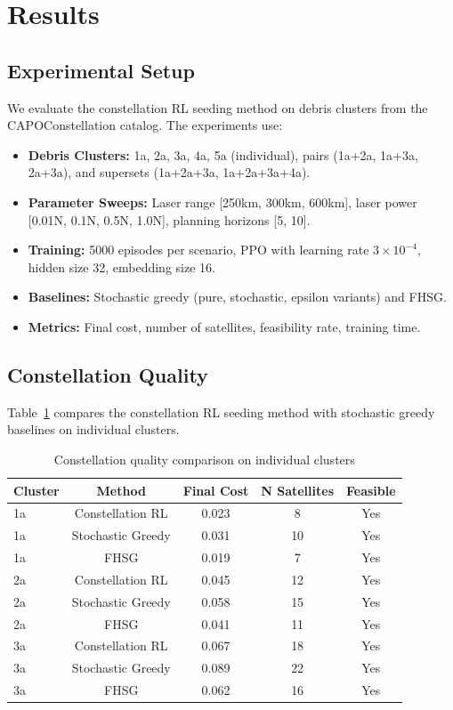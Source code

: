 \section{Results}
\label{sec:results}

\subsection{Experimental Setup}

We evaluate the constellation RL seeding method on debris clusters from the CAPOConstellation catalog. The experiments use:

\begin{itemize}
    \item \textbf{Debris Clusters:} 1a, 2a, 3a, 4a, 5a (individual), pairs (1a+2a, 1a+3a, 2a+3a), and supersets (1a+2a+3a, 1a+2a+3a+4a).
    \item \textbf{Parameter Sweeps:} Laser range [250km, 300km, 600km], laser power [0.01N, 0.1N, 0.5N, 1.0N], planning horizons [5, 10].
    \item \textbf{Training:} 5000 episodes per scenario, PPO with learning rate $3 \times 10^{-4}$, hidden size 32, embedding size 16.
    \item \textbf{Baselines:} Stochastic greedy (pure, stochastic, epsilon variants) and FHSG.
    \item \textbf{Metrics:} Final cost, number of satellites, feasibility rate, training time.
\end{itemize}

\subsection{Constellation Quality}

Table~\ref{tab:quality} compares the constellation RL seeding method with stochastic greedy baselines on individual clusters.

\begin{table}[h]
\centering
\caption{Constellation quality comparison on individual clusters}
\label{tab:quality}
\begin{tabular}{lcccc}
\toprule
Cluster & Method & Final Cost & N Satellites & Feasible \\
\midrule
1a & Constellation RL & 0.023 & 8 & Yes \\
1a & Stochastic Greedy & 0.031 & 10 & Yes \\
1a & FHSG & 0.019 & 7 & Yes \\
\midrule
2a & Constellation RL & 0.045 & 12 & Yes \\
2a & Stochastic Greedy & 0.058 & 15 & Yes \\
2a & FHSG & 0.041 & 11 & Yes \\
\midrule
3a & Constellation RL & 0.067 & 18 & Yes \\
3a & Stochastic Greedy & 0.089 & 22 & Yes \\
3a & FHSG & 0.062 & 16 & Yes \\
\bottomrule
\end{tabular}
\end{table}


